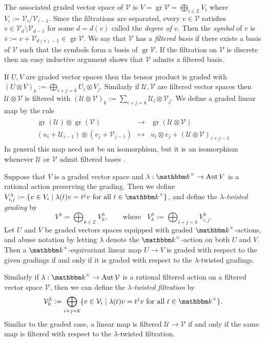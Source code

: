\documentclass[twoside,12pt,reqno]{amsart}
\theoremstyle{remark}
\numberwithin{equation}{section}
\def\bar{\overline}
\def\k{{\mathbbm k}}
\def\gr{\operatorname{gr}}
\def\Aut{\operatorname{Aut}}
\def\Z{{\mathbb Z}}
\def\U{\mathcal{U}}
\def\V{\mathcal{V}}
\begin{document}
The associated graded vector space of $\V$ is $V = \gr \V = \bigoplus_{i\in \Z} V_i$ where $V_i := \V_i / \V_{i-1}$. Since the filtrations are separated, every $v\in \V$ satisfies $v \in \V_d \setminus \V_{d-1}$ for some $d = d(v)$ called the {\it degree of $v$}. Then the {\it symbol} of $v$ is $\bar v := v + \V_{d(v)-1} \in \gr \V$. We say that $\V$ has a {\it filtered basis} if there exists a basis of $\V$ such that the symbols form a basis of $\gr \V$. If the filtration on $\V$ is discrete then an easy inductive argument shows that $\V$ admits a filtered basis.

If $U, V$ are graded vector spaces then the tensor product is graded with $(U\otimes V)_k := \bigoplus_{i + j = k} U_i \otimes V_j$. Similarly if $\U, \V$ are filtered vector spaces then $\U \otimes \V$ is filtered with $(\U\otimes \V)_k := \sum_{i+j = k} \U_i \otimes \V_j$. We define a graded linear map by the rule
\begin{eqnarray}
\label{eq:gradedandtensors}
\begin{array}{ccl}
\gr(\U) \otimes \gr(\V) & \longrightarrow & \gr(\U\otimes \V)\\
(u_i + \U_{i-1}) \otimes (v_j + \V_{j-1}) & \longmapsto &  u_i\otimes v_j + (\U \otimes \V)_{i+j-1}
\end{array}
\end{eqnarray}
In general this map need not be an isomorphism, but it is an isomorphism whenever $\U$ or $\V$ admit filtered bases \cite[Lemma~I.8.2]{NVO}.

Suppose that $V$ is a graded vector space and $\lambda : \k^\times \to \Aut V$ is a rational action preserving the grading. Then we define $V_{i,j}^\lambda := \{ v\in V_i \mid \lambda(t) v = t^jv \text{ for all } t\in \k^\times\}$, and define the {\it $\lambda$-twisted grading} by
\begin{equation}
V^\lambda = \bigoplus_{k \in \Z} V^\lambda_k,\qquad\mbox{where }\,\,\, V^\lambda_k := \bigoplus_{i+j=k} V^\lambda_{i,j}.
\end{equation}
Let $U$ and $V$ be graded vectors spaces equipped with graded $\k^\times$-actions, and abuse notation by letting $\lambda$ denote the $\k^\times$-action on both $U$ and $V$. Then a $\k^\times$-equivariant linear map $U \to V$ is graded with respect to the given gradings if and only if it is graded with respect to the $\lambda$-twisted gradings.

Similarly if $\lambda : \k^\times \to \Aut \V$ is a rational filtered action on a filtered vector space $\V$, then we can define the {\it $\lambda$-twisted filtration} by 
\begin{eqnarray}
\label{eq:twistedfiltration}
\V_k^\lambda := \bigoplus_{i+j=k} \{ v\in \V_i \mid \lambda(t) v = t^jv \text{ for all } t\in \k^\times\}.
\end{eqnarray}
Similar to the graded case, a linear map is filtered $\U \to \V$ if and only if the same map is filtered with respect to the $\lambda$-twisted filtration.
\end{document}
